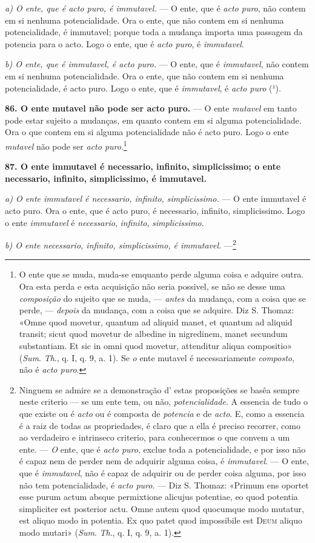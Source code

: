  \emph{a) O ente, que é acto puro, é immutavel.} --- O ente, que é \emph{acto puro}, não contem em si nenhuma potencialidade. Ora o ente, que não contem em si nenhuma potencialidade, é immutavel; porque toda a mudança importa uma passagem da potencia para o acto. Logo o ente, que é \emph{acto puro}, é \emph{immutavel}.

\emph{b) O ente, que é immutavel, é acto puro.} --- O ente, que é \emph{immutavel}, não contem em si nenhuma potencialidade. Ora o ente, que não contem em si nenhuma potencialidade, é acto puro. Logo o ente, que é \emph{immutavel}, é \emph{acto puro} (¹).

\textbf{86. O ente mutavel não pode ser acto puro.} --- O ente \emph{mutavel} em tanto pode estar sujeito a mudanças, em quanto contem em si alguma potencialidade. Ora o que contem em si alguma potencialidade não é acto puro. Logo o ente \emph{mutavel} não pode ser \emph{acto puro}.\footnote{O ente que se muda, muda-se emquanto perde alguma coisa e adquire outra. Ora esta perda e esta acquisição não seria possivel, se não se desse uma \emph{composição} do sujeito que se muda, --- \emph{antes} da mudança, com a coisa que se perde, --- \emph{depois} da mudança, com a coisa que se adquire. Diz S. Thomaz: «Omne quod movetur, quantum ad aliquid manet, et quantum ad aliquid transit; sicut quod movetur de albedine in nigredinem, manet secundum substantiam. Et sic in omni quod movetur, attenditur aliqua compositio» (\emph{Sum}. \emph{Th}., q. I, q. 9, a. 1). Se \emph{o} ente mutavel é necessariamente \emph{composto}, não é \emph{acto puro}.}

\textbf{87. O ente immutavel é necessario, infinito, simplicissimo; o ente necessario, infinito, simplicissimo, é immutavel.}

\emph{a) O ente immutavel é necessario, infinito, simplicissimo.} --- O ente immutavel é acto puro. Ora o ente, que é acto puro, é necessario, infinito, simplicissimo. Logo o ente \emph{immutavel} é \emph{necessario}, \emph{infinito}, \emph{simplicissimo}.

\emph{b) O ente necessario, infinito, simplicissimo, é immutavel.} ---\footnote{Ninguem se admire se a demonstração d' estas proposições se basêa sempre neste criterio --- se um ente tem, ou não, \emph{potencialidade}. A essencia de tudo o que existe ou é \emph{acto} ou é composta de \emph{potencia} e de \emph{acto}. E, como a essencia é a raiz de todas as propriedades, é claro que a ella é preciso recorrer, como ao verdadeiro e intrinseco criterio, para conhecermos o que convem a um ente. --- \emph{O} ente, que é \emph{acto puro}, exclue toda a potencialidade, e por isso não é capaz nem de perder nem de adquirir alguma coisa, é \emph{immutavel}. --- O ente, que é \emph{immutavel}, não é capaz de adquirir ou de perder coisa alguma, por isso não tem potencialidade, é \emph{acto puro}. --- Diz S. Thomaz: «Primum ens oportet esse purum actum absque permixtione alicujus potentiae, eo quod potentia simpliciter est posterior actu. Omne autem quod quocumque modo mutatur, est aliquo modo in potentia. Ex quo patet quod impossibile est \textsc{Deum} aliquo modo mutari» (\emph{Sum}. \emph{Th}., q. I, q. 9, a. 1).}